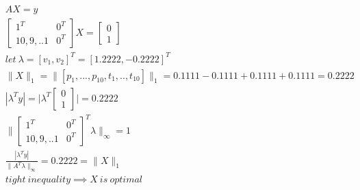 \documentclass[12pt,letter]{article}
\newcommand{\norm}[1]{\|#1\|}
\begin{document}
\begin{enumerate}
\begin{enumerate}
\begin{enumerate}
      \begin{align*}
        &AX=y\\
        &\begin{bmatrix}
          1^T & 0^T\\
          10,9,..1 & 0^T
        \end{bmatrix} X
                     =
                     \begin{bmatrix}
                       0 \\ 1
                     \end{bmatrix}\\
        &let\ \lambda = [v_1, v_2]^T=[1.2222,-0.2222]^T\\
        &\norm{X}_1 = \norm{[p_1,...,p_{10},t_1,..,t_{10}]}_1 = 0.1111-0.1111+0.1111+0.1111=0.2222\\
        &|\lambda^T y| = \bigg|\lambda^T
          \begin{bmatrix}
            0\\1
          \end{bmatrix}\bigg| = 0.2222\\
        &\bigg\|\begin{bmatrix}
          1^T & 0^T\\
          10,9,..1 & 0^T
        \end{bmatrix}^T \lambda\bigg\|_{\infty} = 1\\
        &\frac{|\lambda^T y|}{\norm{A^T\lambda}_{\infty}} = 0.2222 = \norm{X}_1\\
        &tight\ inequality \implies X\ is\ optimal
      \end{align*}
      

\end{enumerate}
\end{enumerate}
\end{enumerate}
\end{document}
